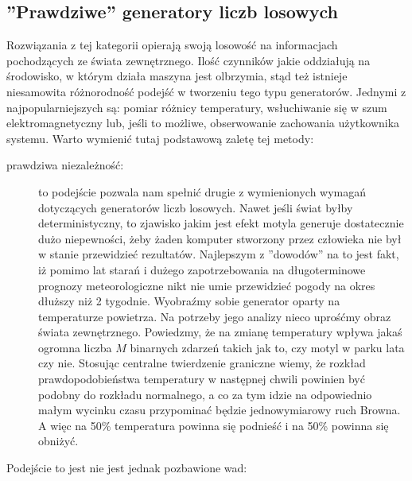 \subsection{''Prawdziwe'' generatory liczb losowych}
Rozwiązania z tej kategorii opierają swoją losowość na informacjach pochodzących ze świata zewnętrznego. Ilość czynników jakie oddziałują na środowisko, w którym działa maszyna jest olbrzymia, stąd też istnieje niesamowita różnorodność podejść w tworzeniu tego typu generatorów. Jednymi z najpopularniejszych są: pomiar różnicy temperatury, wsłuchiwanie się w szum elektromagnetyczny lub, jeśli to możliwe, obserwowanie zachowania użytkownika systemu. Warto wymienić tutaj podstawową zaletę tej metody:
\begin{description}
\item[prawdziwa niezależność:] to podejście pozwala nam spełnić drugie z wymienionych wymagań dotyczących generatorów liczb losowych. Nawet jeśli świat byłby deterministyczny, to zjawisko jakim jest efekt motyla generuje dostatecznie dużo niepewności, żeby żaden komputer stworzony przez człowieka nie był w stanie przewidzieć rezultatów. Najlepszym z ''dowodów'' na to jest fakt, iż pomimo lat starań i dużego zapotrzebowania na długoterminowe prognozy meteorologiczne nikt nie umie przewidzieć pogody na okres dłuższy niż 2 tygodnie. Wyobraźmy sobie generator oparty na temperaturze powietrza. Na potrzeby jego analizy nieco uprośćmy obraz świata zewnętrznego. Powiedzmy, że na zmianę temperatury wpływa jakaś ogromna liczba $M$ binarnych zdarzeń takich jak to, czy motyl w parku lata czy nie. Stosując centralne twierdzenie graniczne wiemy, że rozkład prawdopodobieństwa temperatury w następnej chwili powinien być podobny do rozkładu normalnego, a co za tym idzie na odpowiednio małym wycinku czasu przypominać będzie jednowymiarowy ruch Browna. A więc na 50\% temperatura powinna się podnieść i na 50\% powinna się obniżyć.
\end{description}
Podejście to jest nie jest jednak pozbawione wad:
